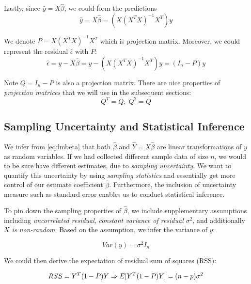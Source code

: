 \documentclass[
]{book}
\begin{document}
Lastly, since \(\hat{y}=X \hat{\beta}\), we could form the predictions
\begin{equation} 
\hat{y} = X \hat{\beta} = (X(X^TX)^{-1} X^T) y
\label{eq:lmyfit}
\end{equation}

We denote \(P=X(X^TX)^{-1} X^T\) which is projection matrix. Moreover, we could represent the residual \(\hat{\epsilon}\) with \(P\):
\begin{equation} 
\hat{\epsilon} = y - X \hat{\beta} = y - (X(X^TX)^{-1} X^T) y = (I_n - P) y
\label{eq:lmresid}
\end{equation}

Note \(Q=I_n - P\) is also a projection matrix. There are nice properties of {\emph{projection matrices}} that we will use in the subsequent sections:
\[
Q^T=Q; \;Q^2=Q
\]

\hypertarget{sampling-uncertainty-and-statistical-inference}{%
\subsection{Sampling Uncertainty and Statistical Inference}\label{sampling-uncertainty-and-statistical-inference}}

We infer from \eqref{eq:lmbeta} that both \(\hat{\beta}\) and \(\hat{Y}= X \hat{\beta}\) are linear transformations of \(y\) as random variables. If we had collected different sample data of size \(n\), we would to be sure have different estimates, due to {\emph{sampling uncertainty}}. We want to quantify this uncertainty by using {\emph{sampling statistics}} and essentially get more control of our estimate coefficient \(\hat{\beta}\). Furthermore, the inclusion of uncertainty measure such as standard error enables us to conduct statistical inference.

To pin down the sampling properties of \(\hat{\beta}\), we include supplementary assumptions including {\emph{uncorrelated residual}}, {\emph{constant variance of residual \(\sigma^2\)}}, and additionally {\emph{\(X\) is non-random}}. Based on the assumption, we infer the variance of \(y\):

\begin{equation} 
Var(y)=\sigma^2 I_n
\label{eq:lmyvar}
\end{equation}

We could then derive the expectation of residual sum of squares (RSS):

\[
RSS = Y^T(1-P)Y  \\
\Rightarrow  E[ Y^T(1-P)Y ] = (n-p) \sigma^2
\]
\end{document}
